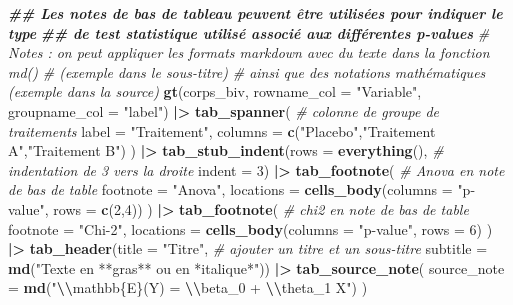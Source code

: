 \documentclass[
]{book}
\newenvironment{Shaded}{\begin{snugshade}}{\end{snugshade}}
\newcommand{\AttributeTok}[1]{\textcolor[rgb]{0.13,0.29,0.53}{#1}}
\newcommand{\CommentTok}[1]{\textcolor[rgb]{0.56,0.35,0.01}{\textit{#1}}}
\newcommand{\DecValTok}[1]{\textcolor[rgb]{0.00,0.00,0.81}{#1}}
\newcommand{\DocumentationTok}[1]{\textcolor[rgb]{0.56,0.35,0.01}{\textbf{\textit{#1}}}}
\newcommand{\FunctionTok}[1]{\textcolor[rgb]{0.13,0.29,0.53}{\textbf{#1}}}
\newcommand{\NormalTok}[1]{#1}
\newcommand{\SpecialCharTok}[1]{\textcolor[rgb]{0.81,0.36,0.00}{\textbf{#1}}}
\newcommand{\StringTok}[1]{\textcolor[rgb]{0.31,0.60,0.02}{#1}}
\begin{document}
\begin{Shaded}
\begin{Highlighting}[]
\DocumentationTok{\#\# Les notes de bas de tableau peuvent être utilisées pour indiquer le type}
\DocumentationTok{\#\# de test statistique utilisé associé aux différentes p{-}values}
\CommentTok{\# Notes : on peut appliquer les formats markdown avec du texte dans la fonction md()}
\CommentTok{\# (exemple dans le sous{-}titre)}
\CommentTok{\# ainsi que des notations mathématiques (exemple dans la source)}
\FunctionTok{gt}\NormalTok{(corps\_biv, }
   \AttributeTok{rowname\_col =} \StringTok{"Variable"}\NormalTok{, }
   \AttributeTok{groupname\_col =} \StringTok{"label"}\NormalTok{) }\SpecialCharTok{|\textgreater{}}
  \FunctionTok{tab\_spanner}\NormalTok{(                          }\CommentTok{\# colonne de groupe de traitements}
    \AttributeTok{label =} \StringTok{"Traitement"}\NormalTok{, }
    \AttributeTok{columns =} \FunctionTok{c}\NormalTok{(}\StringTok{"Placebo"}\NormalTok{,}\StringTok{"Traitement A"}\NormalTok{,}\StringTok{"Traitement B"}\NormalTok{)}
\NormalTok{  ) }\SpecialCharTok{|\textgreater{}}
  \FunctionTok{tab\_stub\_indent}\NormalTok{(}\AttributeTok{rows =} \FunctionTok{everything}\NormalTok{(), }\CommentTok{\# indentation de 3 vers la droite}
                  \AttributeTok{indent =} \DecValTok{3}\NormalTok{) }\SpecialCharTok{|\textgreater{}}       
  \FunctionTok{tab\_footnote}\NormalTok{(                         }\CommentTok{\# Anova en note de bas de table}
    \AttributeTok{footnote =} \StringTok{"Anova"}\NormalTok{,}
    \AttributeTok{locations =} \FunctionTok{cells\_body}\NormalTok{(}\AttributeTok{columns =} \StringTok{"p{-}value"}\NormalTok{, }\AttributeTok{rows =} \FunctionTok{c}\NormalTok{(}\DecValTok{2}\NormalTok{,}\DecValTok{4}\NormalTok{))}
\NormalTok{  ) }\SpecialCharTok{|\textgreater{}}
  \FunctionTok{tab\_footnote}\NormalTok{(                         }\CommentTok{\# chi2 en note de bas de table}
    \AttributeTok{footnote =} \StringTok{"Chi{-}2"}\NormalTok{,}
    \AttributeTok{locations =} \FunctionTok{cells\_body}\NormalTok{(}\AttributeTok{columns =} \StringTok{"p{-}value"}\NormalTok{, }\AttributeTok{rows =} \DecValTok{6}\NormalTok{)}
\NormalTok{  ) }\SpecialCharTok{|\textgreater{}} 
  \FunctionTok{tab\_header}\NormalTok{(}\AttributeTok{title =} \StringTok{"Titre"}\NormalTok{,           }\CommentTok{\# ajouter un titre et un sous{-}titre}
             \AttributeTok{subtitle =} \FunctionTok{md}\NormalTok{(}\StringTok{"Texte en **gras** ou en *italique*"}\NormalTok{)) }\SpecialCharTok{|\textgreater{}}
  \FunctionTok{tab\_source\_note}\NormalTok{(}
    \AttributeTok{source\_note =} \FunctionTok{md}\NormalTok{(}\StringTok{"$$}\SpecialCharTok{\textbackslash{}\textbackslash{}}\StringTok{mathbb\{E\}(Y) = }\SpecialCharTok{\textbackslash{}\textbackslash{}}\StringTok{beta\_0 + }\SpecialCharTok{\textbackslash{}\textbackslash{}}\StringTok{theta\_1 X$$"}\NormalTok{)}
\NormalTok{  )}
\end{Highlighting}
\end{Shaded}
\end{document}
